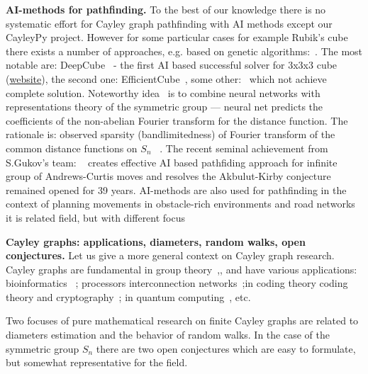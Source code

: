 \documentclass[atmp]{ipart_v1}
\numberwithin{equation}{section}
\theoremstyle{plain}%
\begin{document}
{\bf AI-methods for pathfinding.} 
To the best of our knowledge there is no systematic effort for Cayley graph pathfinding  with AI methods except our CayleyPy project. However for some particular cases for example Rubik's cube there exists a number of approaches, e.g. based on genetic algorithms:~\cite{swita2023solving}.%
The most notable are: DeepCube~\cite{mcaleer2019solving, agostinelli2019solving, khandelwal2024towards,agostinelli2024q} - the first AI based successful solver for 3x3x3 cube (\href{https://deepcube.igb.uci.edu/}{website}), the second one: EfficientCube~\cite{takano2023selfsupervision}, some other:~\cite{brunetto2017deep,johnson2021solving,amrutha2022deep,noever2022puzzle,chasmai2022cubetr,bedaywi2023solving,pan2021fourier} which not achieve complete solution. Noteworthy idea~\cite{pan2021fourier} is to combine neural networks with representations theory of the symmetric group ---  neural net  predicts the coefficients of the non-abelian Fourier transform for the distance function. The rationale is: observed sparsity (bandlimitedness) of Fourier transform of the common distance functions on $S_n$ ~\cite{swan2017harmonic}. The recent seminal achievement from S.Gukov's team: ~\cite{shehper2024makes} creates effective AI based pathfiding approach for infinite group of Andrews-Curtis moves and resolves the  Akbulut-Kirby conjecture remained opened for 39 years. AI-methods are also used for pathfinding in the context of planning movements in obstacle-rich environments and road networks it is related field, but with different focus \cite{pandy2022learning, kirilenko2023transpath} 

{\bf Cayley graphs: applications, diameters, random walks, open conjectures.}
Let us give a more general context on Cayley graph research.
Cayley graphs are fundamental in group theory~\cite{gromov1993geometric},\cite{tao2015expansion}, and have various applications: bioinformatics
~\cite{Pevzner1995human2mice, Pevzner1999cabbage2turnip, wilson2024cayley, bulteau2019parameterized}; processors interconnection networks~\cite{akers1989group, cooperman1991applications,heydemann1997cayley};in coding theory coding theory and cryptography~\cite{hoory2006expander,zemor1994hash,petit2013rubik}; in quantum computing~\cite{ruiz2024quantum,sarkar2024quantum,dinur2023good, acevedo2006exploring,gromada2022some}, etc.


Two focuses of pure mathematical research on finite Cayley graphs are related to diameters estimation and the behavior of random walks. In the case of the symmetric group $S_n$ there are two open conjectures which are easy to formulate, but somewhat representative for the field.  
\end{document}
